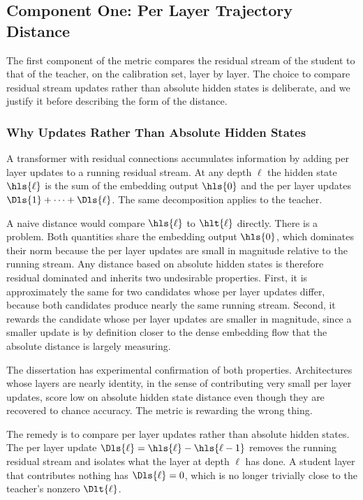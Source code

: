 \subsection{Component One: Per Layer Trajectory Distance}

The first component of the metric compares the residual stream of the student to that of the teacher, on the calibration set, layer by layer. The choice to compare residual stream updates rather than absolute hidden states is deliberate, and we justify it before describing the form of the distance.

\subsubsection{Why Updates Rather Than Absolute Hidden States}

A transformer with residual connections accumulates information by adding per layer updates to a running residual stream. At any depth $\ell$ the hidden state $\hls{\ell}$ is the sum of the embedding output $\hls{0}$ and the per layer updates $\Dls{1} + \cdots + \Dls{\ell}$. The same decomposition applies to the teacher.

A naive distance would compare $\hls{\ell}$ to $\hlt{\ell}$ directly. There is a problem. Both quantities share the embedding output $\hls{0}$, which dominates their norm because the per layer updates are small in magnitude relative to the running stream. Any distance based on absolute hidden states is therefore residual dominated and inherits two undesirable properties. First, it is approximately the same for two candidates whose per layer updates differ, because both candidates produce nearly the same running stream. Second, it rewards the candidate whose per layer updates are smaller in magnitude, since a smaller update is by definition closer to the dense embedding flow that the absolute distance is largely measuring.

The dissertation has experimental confirmation of both properties. Architectures whose layers are nearly identity, in the sense of contributing very small per layer updates, score low on absolute hidden state distance even though they are recovered to chance accuracy. The metric is rewarding the wrong thing.

The remedy is to compare per layer updates rather than absolute hidden states. The per layer update $\Dls{\ell} = \hls{\ell} - \hls{\ell-1}$ removes the running residual stream and isolates what the layer at depth $\ell$ has done. A student layer that contributes nothing has $\Dls{\ell} = 0$, which is no longer trivially close to the teacher's nonzero $\Dlt{\ell}$.

